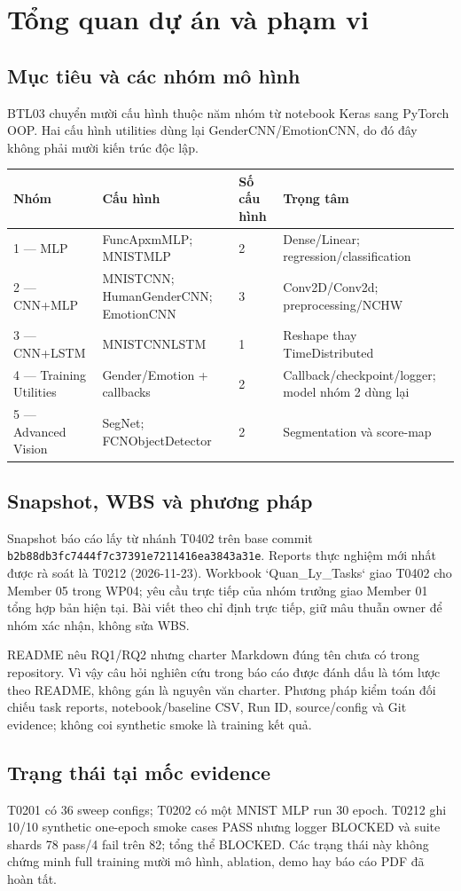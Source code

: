 \chapter{Tổng quan dự án và phạm vi}
\section{Mục tiêu và các nhóm mô hình}
BTL03 chuyển mười cấu hình thuộc năm nhóm từ notebook Keras sang PyTorch OOP. Hai cấu hình utilities dùng lại GenderCNN/EmotionCNN, do đó đây không phải mười kiến trúc độc lập.
\begin{longtable}{p{}p{}p{}p{}}
\toprule Nhóm & Cấu hình & Số cấu hình & Trọng tâm \\
\midrule
1 — MLP & FuncApxmMLP; MNISTMLP & 2 & Dense/Linear; regression/classification \\
2 — CNN+MLP & MNISTCNN; HumanGenderCNN; EmotionCNN & 3 & Conv2D/Conv2d; preprocessing/NCHW \\
3 — CNN+LSTM & MNISTCNNLSTM & 1 & Reshape thay TimeDistributed \\
4 — Training Utilities & Gender/Emotion + callbacks & 2 & Callback/checkpoint/logger; model nhóm 2 dùng lại \\
5 — Advanced Vision & SegNet; FCNObjectDetector & 2 & Segmentation và score-map \\
\bottomrule
\end{longtable}

\section{Snapshot, WBS và phương pháp}
Snapshot báo cáo lấy từ nhánh T0402 trên base commit \texttt{b2b88db3fc7444f7c37391e7211416ea3843a31e}. Reports thực nghiệm mới nhất được rà soát là T0212 (2026-11-23). Workbook `Quan_Ly_Tasks` giao T0402 cho Member 05 trong WP04; yêu cầu trực tiếp của nhóm trưởng giao Member 01 tổng hợp bản hiện tại. Bài viết theo chỉ định trực tiếp, giữ mâu thuẫn owner để nhóm xác nhận, không sửa WBS.

README nêu RQ1/RQ2 nhưng charter Markdown đúng tên chưa có trong repository. Vì vậy câu hỏi nghiên cứu trong báo cáo được đánh dấu là tóm lược theo README, không gán là nguyên văn charter. Phương pháp kiểm toán đối chiếu task reports, notebook/baseline CSV, Run ID, source/config và Git evidence; không coi synthetic smoke là training kết quả.

\section{Trạng thái tại mốc evidence}
T0201 có 36 sweep configs; T0202 có một MNIST MLP run 30 epoch. T0212 ghi 10/10 synthetic one-epoch smoke cases PASS nhưng logger BLOCKED và suite shards 78 pass/4 fail trên 82; tổng thể BLOCKED. Các trạng thái này không chứng minh full training mười mô hình, ablation, demo hay báo cáo PDF đã hoàn tất.